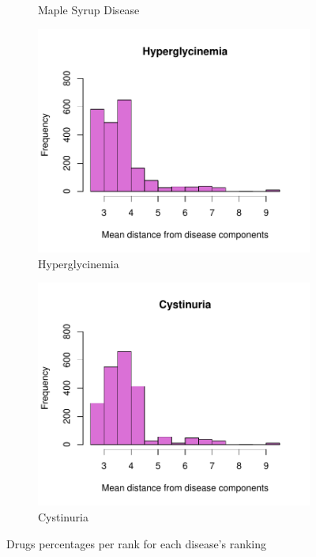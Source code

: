 \begin{figure}[h!]
\begin{subfigure}[b]{0.3\textwidth}
         \caption{Maple Syrup Disease}
         \label{fig:Maple Syrup}
     \end{subfigure}
     \hfill
     \begin{subfigure}[b]{0.3\textwidth}
         \centering
         \includegraphics[scale=0.25]{Images/Hyperglycinemia.pdf}
         \caption{Hyperglycinemia}
         \label{fig:Hyperglycinemia}
     \end{subfigure}
     \hfill
     \begin{subfigure}[b]{0.3\textwidth}
         \centering
         \includegraphics[scale=0.25]{Images/Cystinuria.pdf}
         \caption{Cystinuria}
         \label{fig:Cystinuria}
     \end{subfigure}
     \hfill
    \caption{Drugs percentages per rank for each disease's ranking}
    \label{fig:results}
\end{figure}
\FloatBarrier